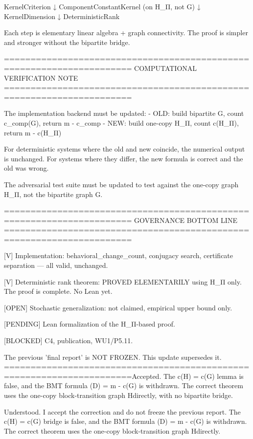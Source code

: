   KernelCriterion
       ↓
  ComponentConstantKernel  (on H_Π, not G)
       ↓
  KernelDimension
       ↓
  DeterministicRank

Each step is elementary linear algebra + graph connectivity.
The proof is simpler and stronger without the bipartite bridge.

======================================================================
COMPUTATIONAL VERIFICATION NOTE
======================================================================

The implementation backend must be updated:
  - OLD: build bipartite G, count c_comp(G), return m - c_comp
  - NEW: build one-copy H_Π, count c(H_Π), return m - c(H_Π)

For deterministic systems where the old and new coincide,
the numerical output is unchanged. For systems where they differ,
the new formula is correct and the old was wrong.

The adversarial test suite must be updated to test against
the one-copy graph H_Π, not the bipartite graph G.

======================================================================
GOVERNANCE BOTTOM LINE
======================================================================

[V]  Implementation: behavioral_change_count, conjugacy search,
     certificate separation — all valid, unchanged.

[V]  Deterministic rank theorem: PROVED ELEMENTARILY using H_Π only.
     The proof is complete. No Lean yet.

[OPEN]  Stochastic generalization: not claimed, empirical upper bound only.

[PENDING]  Lean formalization of the H_Π-based proof.

[BLOCKED]  C4, publication, WU1/P5.11.

The previous 'final report' is NOT FROZEN.
This update supersedes it.
======================================================================Accepted. The c(H\Pi) = c{}(G) lemma is false, and the BMT formula (D\Pi) = m - c{}(G) is withdrawn. The correct theorem uses the one-copy block-transition graph H\Pi directly, with no bipartite bridge.

Understood. I accept the correction and do not freeze the previous report. The c(H\Pi) = c{}(G) bridge is false, and the BMT formula (D\Pi) = m - c{}(G) is withdrawn. The correct theorem uses the one-copy block-transition graph H\Pi directly.

